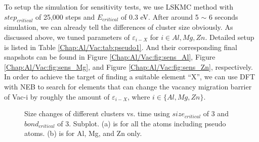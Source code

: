 To setup the simulation for sensitivity tests, we use \ac{LSKMC} method with $step_{critical}$ of 25,000 steps and $E_{critical}$ of 0.3 eV. After around 5 $\sim$ 6 seconds simulation, we can already tell the differences of cluster size obviously. As discussed above, we tuned parameters of $\varepsilon_{i-X}$ for $i \in {Al, Mg, Zn}$. Detailed setup is listed in Table \ref{Chap:Al/Vac:tab:pseudo1}. And their corresponding final snapshots can be found in Figure \ref{Chap:Al/Vac:fig:sens_Al}, Figure \ref{Chap:Al/Vac:fig:sens_Mg}, and Figure \ref{Chap:Al/Vac:fig:sens_Zn}, respectively. In order to achieve the target of finding a suitable element ``X'', we can use \ac{DFT} with \ac{NEB} to search for elements that can change the vacancy migration barrier of Vac-i by roughly the amount of $\varepsilon_{i-X}$, where $i \in \{Al, Mg, Zn\}$.


\newpage
\begingroup
\begin{figure}[!ht]
  \centering
\caption[Size changes of different clusters vs. time using $size_{critical}$ of 3 and $bond_{critical}$ of 3.]{Size changes of different clusters vs. time using $size_{critical}$ of 3 and $bond_{critical}$ of 3. Subplot. (a) is for all the atoms including pseudo atoms. (b) is for Al, Mg, and Zn only.}
\label{Chap:Al/Vac:fig:sens_cluster_size}
\end{figure}
\endgroup

